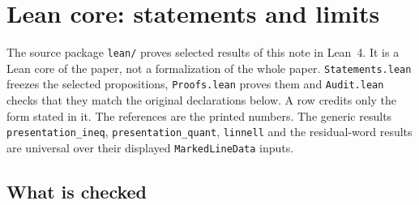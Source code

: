\documentclass[11pt]{article}
\theoremstyle{definition}
\theoremstyle{remark}
\numberwithin{equation}{section}
\newcommand{\lean}[1]{\nolinkurl{#1}}
\begin{document}
\clearpage
\section{Lean core: statements and limits}\label{app:lean-core}
The source package \lean{lean/} proves selected results of this note in
Lean~4. It is a Lean core of the paper, not a formalization of the whole
paper. \lean{Statements.lean} freezes the selected propositions,
\lean{Proofs.lean} proves them and \lean{Audit.lean} checks that they match
the original declarations below. A row credits only the form stated in it.
The references are the printed numbers. The generic results
\lean{presentation_ineq}, \lean{presentation_quant}, \lean{linnell} and the
residual-word results are universal over their displayed
\lean{MarkedLineData} inputs.

\subsection*{What is checked}
\end{document}
